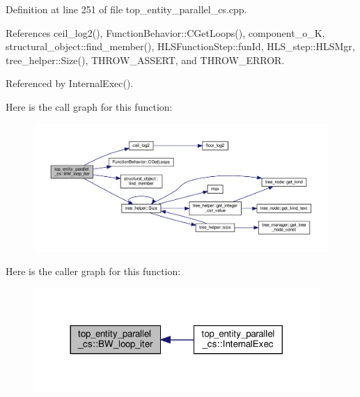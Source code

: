 Definition at line 251 of file top\+\_\+entity\+\_\+parallel\+\_\+cs.\+cpp.



References ceil\+\_\+log2(), Function\+Behavior\+::\+C\+Get\+Loops(), component\+\_\+o\+\_\+K, structural\+\_\+object\+::find\+\_\+member(), H\+L\+S\+Function\+Step\+::fun\+Id, H\+L\+S\+\_\+step\+::\+H\+L\+S\+Mgr, tree\+\_\+helper\+::\+Size(), T\+H\+R\+O\+W\+\_\+\+A\+S\+S\+E\+RT, and T\+H\+R\+O\+W\+\_\+\+E\+R\+R\+OR.



Referenced by Internal\+Exec().

Here is the call graph for this function\+:
\nopagebreak
\begin{figure}[H]
\begin{center}
\leavevmode
\includegraphics[width=350pt]{d8/d37/classtop__entity__parallel__cs_ab027d23496745ebc6f32b29cafa10759_cgraph}
\end{center}
\end{figure}
Here is the caller graph for this function\+:
\nopagebreak
\begin{figure}[H]
\begin{center}
\leavevmode
\includegraphics[width=308pt]{d8/d37/classtop__entity__parallel__cs_ab027d23496745ebc6f32b29cafa10759_icgraph}
\end{center}
\end{figure}
\mbox{\label{classtop__entity__parallel__cs_a619b309604994e682d4f2c4f0989efde}} 
